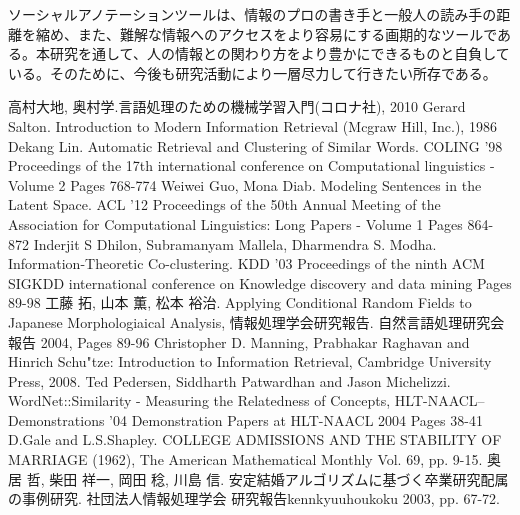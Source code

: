 \documentclass[12pt]{jarticle}
\begin{document}
ソーシャルアノテーションツールは、情報のプロの書き手と一般人の読み手の距離を縮め、また、難解な情報へのアクセスをより容易にする画期的なツールである。本研究を通して、人の情報との関わり方をより豊かにできるものと自負している。そのために、今後も研究活動により一層尽力して行きたい所存である。

\newpage
\pagestyle{empty}
\begin{thebibliography}{9}
   高村大地, 奥村学.言語処理のための機械学習入門(コロナ社), 2010
   Gerard Salton. Introduction to Modern Information Retrieval (Mcgraw Hill, Inc.), 1986
   Dekang Lin. Automatic Retrieval and Clustering of Similar Words. COLING '98 Proceedings of the 17th international conference on Computational linguistics - Volume 2 Pages 768-774
   Weiwei Guo, Mona Diab. Modeling Sentences in the Latent Space. ACL '12 Proceedings of the 50th Annual Meeting of the Association for Computational Linguistics: Long Papers - Volume 1
Pages 864-872
   Inderjit S Dhilon, Subramanyam Mallela, Dharmendra S. Modha. Information-Theoretic Co-clustering. KDD '03 Proceedings of the ninth ACM SIGKDD international conference on Knowledge discovery and data mining
Pages 89-98
  工藤 拓, 山本 薫, 松本 裕治. Applying Conditional Random Fields to Japanese Morphologiaical Analysis, 情報処理学会研究報告. 自然言語処理研究会報告 2004, Pages 89-96
  Christopher D. Manning, Prabhakar Raghavan and Hinrich Schu"tze: Introduction to Information Retrieval, Cambridge University Press, 2008.
 Ted Pedersen, Siddharth Patwardhan and Jason Michelizzi. WordNet::Similarity - Measuring the Relatedness of Concepts, HLT-NAACL--Demonstrations '04 Demonstration Papers at HLT-NAACL 2004 Pages 38-41
  D.Gale and L.S.Shapley. COLLEGE ADMISSIONS AND THE STABILITY OF MARRIAGE (1962), The American Mathematical Monthly Vol. 69, pp. 9-15.
  奥居 哲, 柴田 祥一, 岡田 稔, 川島 信. 安定結婚アルゴリズムに基づく卒業研究配属の事例研究. 社団法人情報処理学会 研究報告kennkyuuhoukoku 2003, pp. 67-72.
\end{thebibliography}
\end{document}
